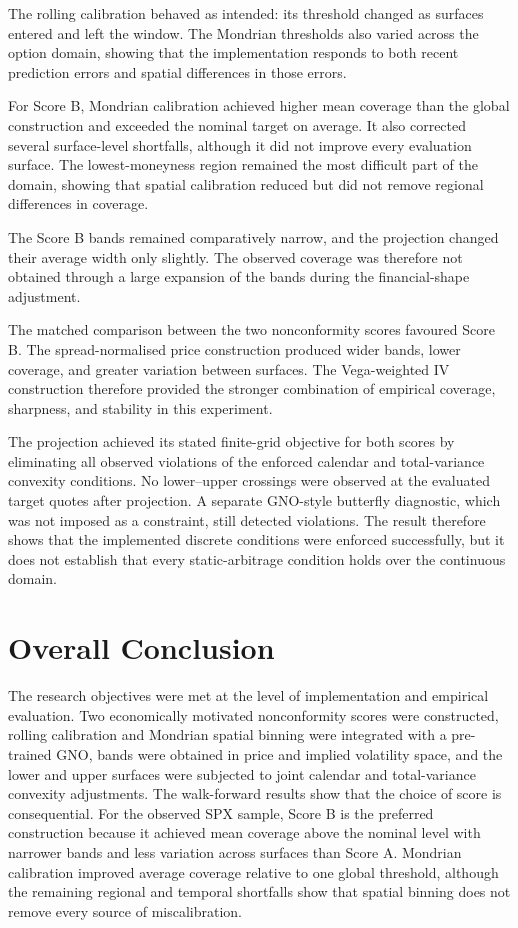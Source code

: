 The rolling calibration behaved as intended: its threshold changed as surfaces entered and left the window. The Mondrian thresholds also varied across the option domain, showing that the implementation responds to both recent prediction errors and spatial differences in those errors.

For Score B, Mondrian calibration achieved higher mean coverage than the global construction and exceeded the nominal target on average. It also corrected several surface-level shortfalls, although it did not improve every evaluation surface. The lowest-moneyness region remained the most difficult part of the domain, showing that spatial calibration reduced but did not remove regional differences in coverage.

The Score B bands remained comparatively narrow, and the projection changed their average width only slightly. The observed coverage was therefore not obtained through a large expansion of the bands during the financial-shape adjustment.

The matched comparison between the two nonconformity scores favoured Score B. The spread-normalised price construction produced wider bands, lower coverage, and greater variation between surfaces. The Vega-weighted IV construction therefore provided the stronger combination of empirical coverage, sharpness, and stability in this experiment.

The projection achieved its stated finite-grid objective for both scores by eliminating all observed violations of the enforced calendar and total-variance convexity conditions. No lower--upper crossings were observed at the evaluated target quotes after projection. A separate GNO-style butterfly diagnostic, which was not imposed as a constraint, still detected violations. The result therefore shows that the implemented discrete conditions were enforced successfully, but it does not establish that every static-arbitrage condition holds over the continuous domain.

\section{Overall Conclusion}

The research objectives were met at the level of implementation and empirical evaluation. Two economically motivated nonconformity scores were constructed, rolling calibration and Mondrian spatial binning were integrated with a pre-trained GNO, bands were obtained in price and implied volatility space, and the lower and upper surfaces were subjected to joint calendar and total-variance convexity adjustments. The walk-forward results show that the choice of score is consequential. For the observed SPX sample, Score B is the preferred construction because it achieved mean coverage above the nominal level with narrower bands and less variation across surfaces than Score A. Mondrian calibration improved average coverage relative to one global threshold, although the remaining regional and temporal shortfalls show that spatial binning does not remove every source of miscalibration.

